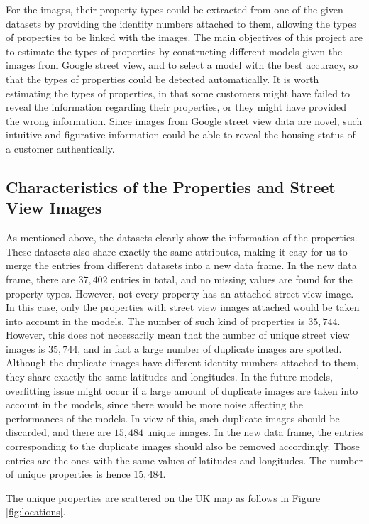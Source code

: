 \documentclass[11pt,twoside]{article}
\numberwithin{Theorem}{section}
\numberwithin{Definition}{section}
\numberwithin{Lemma}{section}
\numberwithin{Algorithm}{section}
\numberwithin{equation}{section}
\begin{document}
For the images, their property types could be extracted from one of the given datasets by providing the identity numbers attached to them, allowing the types of properties to be linked with the images. The main objectives of this project are to estimate the types of properties by constructing different models given the images from Google street view, and to select a model with the best accuracy, so that the types of properties could be detected automatically. It is worth estimating the types of properties, in that some customers might have failed to reveal the information regarding their properties, or they might have provided the wrong information. Since images from Google street view data are novel, such intuitive and figurative information could be able to reveal the housing status of a customer authentically.

\subsection{Characteristics of the Properties and Street View Images}
As mentioned above, the datasets clearly show the information of the properties. These datasets also share exactly the same attributes, making it easy for us to merge the entries from different datasets into a new data frame. In the new data frame, there are $37,402$ entries in total, and no missing values are found for the property types. However, not every property has an attached street view image. In this case, only the properties with street view images attached would be taken into account in the models. The number of such kind of properties is $35,744$. However, this does not necessarily mean that the number of unique street view images is $35,744$, and in fact a large number of duplicate images are spotted. Although the duplicate images have different identity numbers attached to them, they share exactly the same latitudes and longitudes. In the future models, overfitting issue might occur if a large amount of duplicate images are taken into account in the models, since there would be more noise affecting the performances of the models. In view of this, such duplicate images should be discarded, and there are $15,484$ unique images. In the new data frame, the entries corresponding to the duplicate images should also be removed accordingly. Those entries are the ones with the same values of latitudes and longitudes. The number of unique properties is hence $15,484$.

The unique properties are scattered on the UK map as follows in Figure \ref{fig:locations}. 
\end{document}
